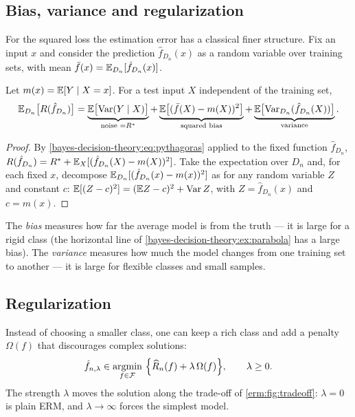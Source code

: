 \begin{notechapter}
\section{Bias, variance and regularization}\label{erm:sec:bias-variance}

For the squared loss the estimation error has a classical finer structure.
Fix an input $x$ and consider the prediction $\hat f_{D_n}(x)$ as a random
variable over training sets, with mean $\bar f(x) = \mathbb{E}_{D_n}[\hat f_{D_n}(x)]$.

\begin{proposition}\label{erm:prop:bias-variance}
Let $m(x) = \mathbb{E}[Y \mid X=x]$. For a test input $X$ independent of the training
set,
\[
  \mathbb{E}_{D_n}\bigl[R(\hat f_{D_n})\bigr]
  = \underbrace{\mathbb{E}\bigl[\operatorname{Var}(Y\mid X)\bigr]}_{\text{noise } = R^*}
  + \underbrace{\mathbb{E}\bigl[(\bar f(X) - m(X))^2\bigr]}_{\text{squared bias}}
  + \underbrace{\mathbb{E}\bigl[\operatorname{Var}_{D_n}(\hat f_{D_n}(X))\bigr]}_{\text{variance}} .
\]
\end{proposition}

\begin{proof}
By \eqref{bayes-decision-theory:eq:pythagoras} applied to the fixed function
$\hat f_{D_n}$, $R(\hat f_{D_n}) = R^* + \mathbb{E}_X[(\hat f_{D_n}(X) - m(X))^2]$.
Take the expectation over $D_n$ and, for each fixed $x$, decompose
$\mathbb{E}_{D_n}[(\hat f_{D_n}(x) - m(x))^2]$ as for any random variable $Z$ and constant
$c$: $\mathbb{E}[(Z - c)^2] = (\mathbb{E} Z - c)^2 + \operatorname{Var} Z$, with $Z = \hat f_{D_n}(x)$ and $c = m(x)$.
\end{proof}

The \emph{bias} measures how far the average model is from the truth --- it is
large for a rigid class (the horizontal line of
\cref{bayes-decision-theory:ex:parabola} has a large bias). The
\emph{variance} measures how much the model changes from one training set to
another --- it is large for flexible classes and small samples.

\subsection{Regularization}

Instead of choosing a smaller class, one can keep a rich class and add a
penalty $\Omega(f)$ that discourages complex solutions:
\[
  \hat f_{n,\lambda} \in \operatorname*{argmin}_{f\in\mathcal{F}}\ \Bigl\{\widehat{R}_n(f) + \lambda\,\Omega(f)\Bigr\},
  \qquad \lambda \geq 0 .
\]
The strength $\lambda$ moves the solution along the trade-off of
\cref{erm:fig:tradeoff}: $\lambda = 0$ is plain ERM, and $\lambda \to \infty$
forces the simplest model.


\end{notechapter}
